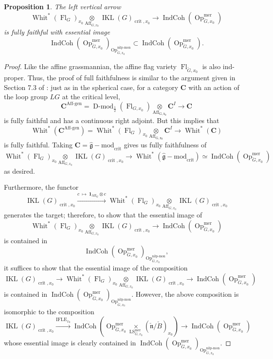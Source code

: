 \documentclass[10pt]{amsart}
\newtheorem{prop}[subsubsection]{Proposition}
\theoremstyle{remark}
\newcommand{\on}[1]{\operatorname{#1}}
\newcommand{\Dmodh}{\on{D-mod}_{\frac{1}{2}}}
\newcommand{\IndCoh}{\on{IndCoh}}
\newcommand{\gmod}{\on{\hat{\mathfrak{g}}-mod}}
\newcommand{\IKLx}{\on{IKL}(G)_{\on{crit}, x_0}}
\newcommand{\Gcheck}{\check{G}}
\newcommand{\ncheck}{\check{\mathfrak{n}}}
\newcommand{\Bcheck}{\check{B}}
\begin{document}
\begin{prop}
    The left vertical arrow
    $$
    \on{Whit}^*(\on{Fl}_G)_{x_0} \underset{\on{Aff}_{G, x_0}}{\otimes} \IKLx \longrightarrow \IndCoh(\on{Op}_{\Gcheck, x_0}^{\on{mer}})
    $$
    is fully faithful with essential image
    $$
    \IndCoh(\on{Op}_{\Gcheck, x_0}^{\on{mer}})_{\on{Op}_{\Gcheck, x_0}^{\on{nilp-mon}}} \subset \IndCoh(\on{Op}_{\Gcheck, x_0}^{\on{mer}}).
    $$ 
\end{prop}
\begin{proof}
    Like the affine grassmannian, the affine flag variety $\on{Fl}_{\Gcheck, x_0}$ is also ind-proper. Thus, the proof of full faithfulness is similar to the argument given in Section 7.3 of \cite{GLC2}: just as in the spherical case, for a category $\boldsymbol{C}$ with an action of the loop group $LG$ at the critical level,
    $$
    \boldsymbol{C}^{\on{Aff-gen}} = \Dmodh(\on{Fl}_{G, x_0}) \underset{\on{Aff_{G, x_0}}}{\otimes} \boldsymbol{C}^I \longrightarrow \boldsymbol{C}
    $$
    is fully faithful and has a continuous right adjoint. But this implies that 
    $$
    \on{Whit}^*(\boldsymbol{C}^{\on{Aff-gen}}) = \on{Whit}^*(\on{Fl}_G)_{x_0} \underset{\on{Aff_{G, x_0}}}{\otimes} \boldsymbol{C}^I \longrightarrow \on{Whit}^*(\boldsymbol{C})
    $$
    is fully faithful. Taking $\boldsymbol{C} = \gmod_{\on{crit}}$ gives us fully faithfulness of
    $$
    \on{Whit}^*(\on{Fl}_G)_{x_0} \underset{\on{Aff}_{G, x_0}}{\otimes} \IKLx \longrightarrow \on{Whit}^*(\gmod_{\on{crit}}) \simeq \IndCoh(\on{Op}_{\Gcheck, x_0}^{\on{mer}})
    $$
    as desired.

    Furthermore, the functor
    $$
    \IKLx \overset{c \ \mapsto \ \boldsymbol{1}_{\on{Aff}_G} \otimes c}{\longrightarrow} \on{Whit}^*(\on{Fl}_G)_{x_0} \underset{\on{Aff}_{G, x_0}}{\otimes} \IKLx
    $$
    generates the target; therefore, to  show that the essential image of 
    $$
    \on{Whit}^*(\on{Fl}_G)_{x_0} \underset{\on{Aff}_{G, x_0}}{\otimes} \IKLx \to \IndCoh(\on{Op}_{\Gcheck, x_0}^{\on{mer}})
    $$
    is contained in 
    $$
    \IndCoh(\on{Op}_{\Gcheck, x_0}^{\on{mer}})_{\on{Op}_{\Gcheck, x_0}^{\on{nilp-mon}}},
    $$
    it suffices to show that the essential image of the composition
    $$
    \IKLx \to \on{Whit}^*(\on{Fl}_G)_{x_0} \underset{\on{Aff}_{G, x_0}}{\otimes} \IKLx \to \IndCoh(\on{Op}_{\Gcheck, x_0}^{\on{mer}})
    $$
    is contained in $\IndCoh(\on{Op}_{\Gcheck, x_0}^{\on{mer}})_{\on{Op}_{\Gcheck, x_0}^{\on{nilp-mon}}}$. However, the above composition is isomorphic to the composition
    $$
    \IKLx \overset{\on{IFLE}_{x_0}}{\longrightarrow} \IndCoh(\on{Op}_{\Gcheck, x_0}^{\on{mer}} \underset{\on{LS}_{\Gcheck, x_0}^{\on{mer}}}{\times} (\ncheck/\Bcheck)_{x_0}) \to 
    \IndCoh(\on{Op}_{\Gcheck, x_0}^{\on{mer}})
    $$
    whose essential image is clearly contained in $\IndCoh(\on{Op}_{\Gcheck, x_0}^{\on{mer}})_{\on{Op}_{\Gcheck, x_0}^{\on{nilp-mon}}}$.


\end{proof}
\end{document}
